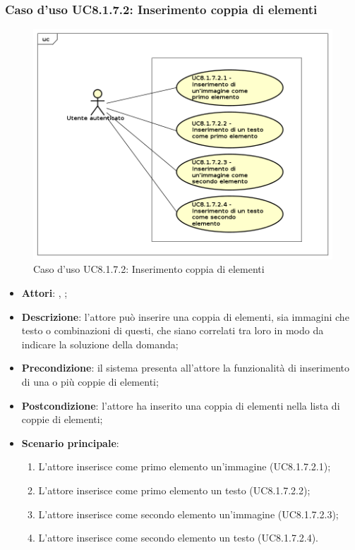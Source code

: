 	\subsubsection{Caso d'uso UC8.1.7.2: Inserimento coppia di elementi}
	\begin{figure}[h]
		\centering
		\includegraphics[scale=0.5,keepaspectratio]{UML/UC8_1_7_2.png}
		\caption{Caso d'uso UC8.1.7.2: Inserimento coppia di elementi}
	\end{figure}
	\FloatBarrier
	\begin{itemize}
		\item \textbf{Attori}: \uau, \uaupro;
		\item \textbf{Descrizione}: l'attore può inserire una coppia di elementi, sia immagini che testo o combinazioni di questi, che siano correlati tra loro in modo da indicare la soluzione della domanda; 
		\item \textbf{Precondizione}: il sistema presenta all'attore la funzionalità di inserimento di una o più coppie di elementi;
		\item \textbf{Postcondizione}: l'attore ha inserito una coppia di elementi nella lista di coppie di elementi; 
		\item \textbf{Scenario principale}: 
		\begin{enumerate}
			\item L'attore inserisce come primo elemento un'immagine (UC8.1.7.2.1);
			\item L'attore inserisce come primo elemento un testo (UC8.1.7.2.2);
			\item L'attore inserisce come secondo elemento un'immagine (UC8.1.7.2.3);
			\item L'attore inserisce come secondo elemento un testo (UC8.1.7.2.4).	
		\end{enumerate}
	\end{itemize}
	
